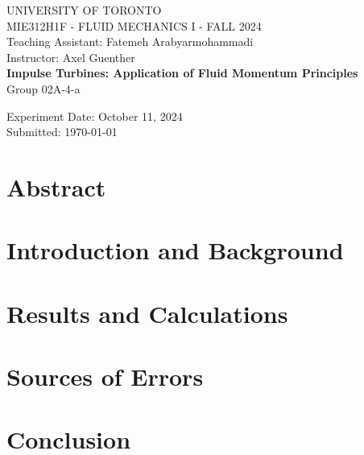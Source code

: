 \documentclass[12pt]{article}
\begin{document}
    \begin{titlepage}
        \begin{center}
        UNIVERSITY OF TORONTO\\
        MIE312H1F - FLUID MECHANICS I - FALL 2024\\
        Teaching Assistant: Fatemeh Arabyarmohammadi\\
        Instructor: Axel Guenther\\
        \vspace{96pt}
        \huge \textbf{Impulse Turbines: Application of Fluid Momentum Principles}\\
        \vspace{120pt}
        \large Group 02A-4-a\\
        \vspace{12pt}

        \begin{table}[H]
            \centering
        \end{table}
        \vspace{60pt}
        Experiment Date: October 11, 2024\\
        Submitted: \today \\
        \end{center}
    \end{titlepage}

\section{Abstract}

\section{Introduction and Background}

\section{Results and Calculations}

\section{Sources of Errors}

\section{Conclusion}
\end{document}
